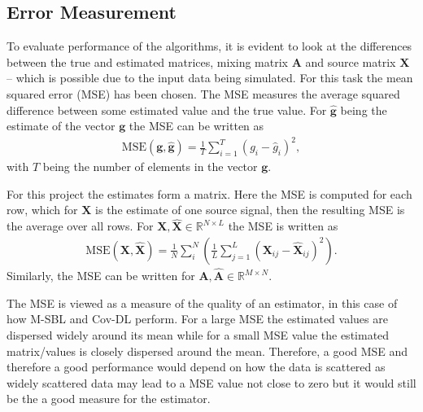 \subsection{Error Measurement}\label{sec:mse}  
To evaluate performance of the algorithms, it is evident to look at the differences between the true and estimated matrices, mixing matrix $\mathbf{A}$ and source matrix $\mathbf{X}$ -- which is possible due to the input data being simulated. 
For this task the mean squared error (MSE) has been chosen. 
The MSE measures the average squared difference between some estimated value and the true value. 
For $\hat{\textbf{g}}$ being the estimate of the vector $\textbf{g}$ the MSE can be written as 
\begin{align*}
\text{MSE}(\textbf{g},\hat{\textbf{g}}) = \frac{1}{T} \sum_{i=1}^T (g_i - \hat{g}_i)^2, 
\end{align*}
with $T$ being the number of elements in the vector $\textbf{g}$. 

For this project the estimates form a matrix. Here the MSE is computed for each row, which for $\mathbf{X}$ is the estimate of one source signal, then the resulting MSE is the average over all rows. 
For $\mathbf{X}, \hat{\mathbf{X}} \in \mathbb{R}^{N \times L}$ the MSE is written as 
\begin{align*}
\text{MSE}(\mathbf{X},\hat{\mathbf{X}}) = \frac{1}{N} \sum_{i}^{N} \left( \frac{1}{L} \sum_{j=1}^L (\mathbf{X}_{ij} - \hat{\mathbf{X}}_{ij})^2\right).  
\end{align*}
Similarly, the MSE can be written for $\mathbf{A},\hat{\mathbf{A}} \in \mathbb{R}^{M \times N}$.  

The MSE is viewed as a measure of the quality of an estimator, in this case of how M-SBL and Cov-DL perform. 
For a large MSE the estimated values are dispersed widely around its mean while for a small MSE value the estimated matrix/values is closely dispersed around the mean. 
Therefore, a good MSE and therefore a good performance would depend on how the data is scattered as widely scattered data may lead to a MSE value not close to zero but it would still be the a good measure for the estimator.
